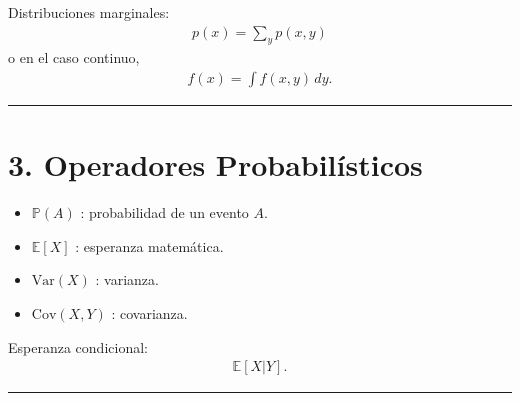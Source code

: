 \documentclass[letterpaper,10pt,english]{jupyterBook}
\begin{document}
\sphinxAtStartPar
Distribuciones marginales:
\begin{equation*}
\begin{split}
p(x) = \sum_y p(x,y)
\end{split}
\end{equation*}
\sphinxAtStartPar
o en el caso continuo,
\begin{equation*}
\begin{split}
f(x) = \int f(x,y)\,dy.
\end{split}
\end{equation*}

\bigskip\hrule\bigskip



\section{3. Operadores Probabilísticos}
\label{\detokenize{00_frontmatter/notation:operadores-probabilisticos}}\begin{itemize}
\item {} 
\sphinxAtStartPar
\(\mathbb{P}(A)\) : probabilidad de un evento \(A\).

\item {} 
\sphinxAtStartPar
\(\mathbb{E}[X]\) : esperanza matemática.

\item {} 
\sphinxAtStartPar
\(\mathrm{Var}(X)\) : varianza.

\item {} 
\sphinxAtStartPar
\(\mathrm{Cov}(X,Y)\) : covarianza.

\end{itemize}

\sphinxAtStartPar
Esperanza condicional:
\begin{equation*}
\begin{split}
\mathbb{E}[X|Y].
\end{split}
\end{equation*}

\bigskip\hrule\bigskip
\end{document}
